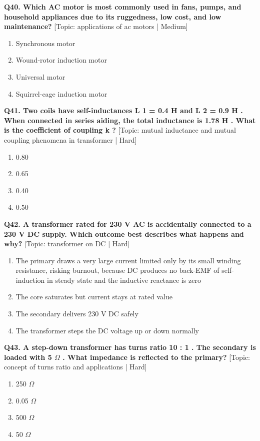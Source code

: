 \noindent\textbf{Q40. Which AC motor is most commonly used in fans, pumps, and household appliances due to its ruggedness, low cost, and low maintenance?} \hfill [Topic: applications of ac motors | Medium]
\begin{enumerate}[label=(\alph*),topsep=2pt,itemsep=1pt,partopsep=0pt,parsep=0pt]
    \item {Synchronous motor}
    \item {Wound-rotor induction motor}
    \item {Universal motor}
    \item {Squirrel-cage induction motor}
\end{enumerate}
\vspace{2mm}

\noindent\textbf{Q41. Two coils have self-inductances L 1 = 0.4 H and L 2 = 0.9 H . When connected in series aiding, the total inductance is 1.78 H . What is the coefficient of coupling k ?} \hfill [Topic: mutual inductance and mutual coupling phenomena in transformer | Hard]
\begin{enumerate}[label=(\alph*),topsep=2pt,itemsep=1pt,partopsep=0pt,parsep=0pt]
    \item {0.80}
    \item {0.65}
    \item {0.40}
    \item {0.50}
\end{enumerate}
\vspace{2mm}

\noindent\textbf{Q42. A transformer rated for 230 V AC is accidentally connected to a 230 V DC supply. Which outcome best describes what happens and why?} \hfill [Topic: transformer on DC | Hard]
\begin{enumerate}[label=(\alph*),topsep=2pt,itemsep=1pt,partopsep=0pt,parsep=0pt]
    \item {The primary draws a very large current limited only by its small winding resistance, risking burnout, because DC produces no back-EMF of self-induction in steady state and the inductive reactance is zero}
    \item {The core saturates but current stays at rated value}
    \item {The secondary delivers 230 V DC safely}
    \item {The transformer steps the DC voltage up or down normally}
\end{enumerate}
\vspace{2mm}

\noindent\textbf{Q43. A step-down transformer has turns ratio 10 : 1 . The secondary is loaded with 5 $\Omega$ . What impedance is reflected to the primary?} \hfill [Topic: concept of turns ratio and applications | Hard]
\begin{enumerate}[label=(\alph*),topsep=2pt,itemsep=1pt,partopsep=0pt,parsep=0pt]
    \item {250 $\Omega$}
    \item {0.05 $\Omega$}
    \item {500 $\Omega$}
    \item {50 $\Omega$}
\end{enumerate}
\vspace{2mm}

